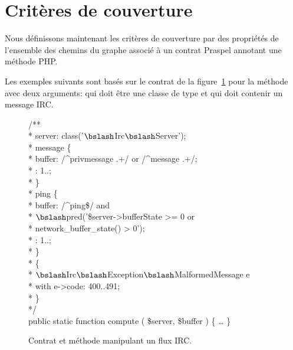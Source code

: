 \section{Critères de couverture}
\label{section:test:criteria}

Nous définissons maintenant les critères de couverture par des propriétés de
l'ensemble des chemins du graphe associé à un contrat Praspel annotant une
méthode PHP.

Les exemples suivants sont basés sur le contrat de la
figure~\ref{figure:test:irc} pour la méthode  avec deux arguments:
 qui doit être une classe de type
 et  qui doit contenir un message
IRC.
%
\begin{figure}

\begin{bigpre}
/** \\
 * \arequires server: class('\(\bslash\)Irc\(\bslash\)Server'); \\
 * \abehavior message \{ \\
 *     \arequires buffer: /^privmessage .+/ or /^message .+/; \\
 *     \aensures  \aresult: 1..; \\
 * \} \\
 * \abehavior ping \{ \\
 *     \arequires buffer: /^ping\$/ and \\
 *               \(\bslash\)pred('\$server->bufferState   >= 0 or \\
 *                      network\_buffer\_state() >  0'); \\
 *     \aensures  \aresult: 1..; \\
 * \} \\
 * \adefault \{ \\
 *     \athrowable \(\bslash\)Irc\(\bslash\)Exception\(\bslash\)MalformedMessage e \\
 *                    with e->code: 400..491; \\
 * \} \\
 */ \\
public static function compute ( \$server, \$buffer ) \{ … \}
\end{bigpre}

\caption{\label{figure:test:irc} Contrat et méthode manipulant un flux IRC.}

\end{figure}

